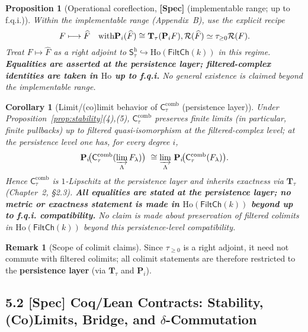 \documentclass[11pt]{article}
\DeclareRobustCommand{\hyp}{\nobreakdash-}
\numberwithin{equation}{section}
\newtheorem{proposition}[theorem]{Proposition}
\newtheorem{corollary}[theorem]{Corollary}
\theoremstyle{definition}
\newtheorem{remark}[theorem]{Remark}
\providecommand{\n}{\unskip\space}
\begin{document}
\begin{proposition}[Operational coreflection, \textbf{[Spec]} (implementable range; up to f.q.i.)]\label{prop:operational-coreflection-spec}
Within the implementable range (Appendix~B), use the explicit recipe
\[
F\longmapsto \widehat F\quad\text{with}\quad\n\mathbf{P}_i(\widehat F)\cong \mathbf{T}_\tau(\mathbf{P}_iF),\qquad\n\mathcal{R}(\widehat F)\simeq \tau_{\ge 0}\mathcal{R}(F).
\]
Treat $F\mapsto \widehat F$ as a right adjoint to $\mathsf{S}_\tau^{\mathrm{h}}\hookrightarrow \mathrm{Ho}(\mathsf{FiltCh}(k))$
\emph{in this regime}. \emph{\textbf{Equalities are asserted at the persistence layer; filtered-complex identities are taken in $\mathrm{Ho}$ up to f.q.i.}} No general existence is claimed beyond the implementable range.
\end{proposition}

\begin{corollary}[Limit/(co)limit behavior of $\mathsf{C}_\tau^{\mathrm{comb}}$ (persistence layer)]
Under Proposition~\ref{prop:stability}(4),(5), $\mathsf{C}_\tau^{\mathrm{comb}}$ preserves finite limits
(in particular, finite pullbacks) \emph{up to filtered quasi\hyp isomorphism} at the filtered\hyp complex level; at the
\emph{persistence level} one has, for every degree $i$,
\[
\mathbf{P}_i\!\big(\mathsf{C}_\tau^{\mathrm{comb}}(\varinjlim_\Lambda F_\lambda)\big)\ \cong\ \n\varinjlim_\Lambda\, \mathbf{P}_i\!\big(\mathsf{C}_\tau^{\mathrm{comb}}(F_\lambda)\big).
\]
Hence $\mathsf{C}_\tau^{\mathrm{comb}}$ is $1$-Lipschitz at the persistence layer and inherits exactness via $\mathbf{T}_\tau$ (Chapter~2, §2.3). \emph{\textbf{All equalities are stated at the persistence layer; no metric or exactness statement is made in $\mathrm{Ho}(\mathsf{FiltCh}(k))$ beyond up to f.q.i. compatibility.}} No claim is made about preservation of filtered colimits in $\mathrm{Ho}(\mathsf{FiltCh}(k))$ beyond this persistence\hyp level compatibility.
\end{corollary}

\begin{remark}[Scope of colimit claims]
Since $\tau_{\ge 0}$ is a right adjoint, it need not commute with filtered colimits; all colimit statements are therefore restricted to the \textbf{persistence layer} (via $\mathbf{T}_\tau$ and $\mathbf{P}_i$).
\end{remark}

\subsection*{5.2 \texorpdfstring{[Spec]}{[Spec]} Coq/Lean Contracts: Stability, (Co)Limits, Bridge, and $\delta$-Commutation}
\end{document}
